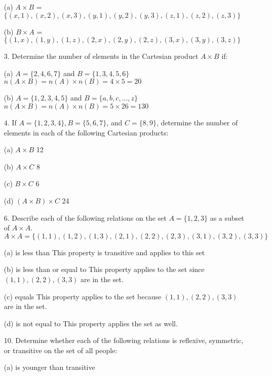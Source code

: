 \documentclass{article}
\begin{document}
\begin{itemize}
    (a) $A \times B$ {\color{blue} = $\{(x,1), (x,2), (x,3), (y,1), (y,2), (y,3), (z,1), (z,2), (z,3)\}$}
    
    (b) $B \times A$ {\color{blue} = $\{(1,x), (1,y), (1,z), (2,x), (2,y), (2,z), (3,x), (3,y), (3,z)\}$}
    
    \item[3.] Determine the number of elements in the Cartesian product $A \times B$ if:
    
    (a) $A = \{2, 4, 6, 7\}$ and $B = \{1, 3, 4, 5, 6\}$ {\color{blue} $n(A \times B) = n(A) \times n(B) = 4\times5 = 20$} 
    
    (b) $A = \{1, 2, 3, 4, 5\}$ and $B = \{a, b, c, ..., z\}$ {\color{blue} $n(A \times B) = n(A) \times n(B) = 5 \times 26 = 130$} 
    
    \item[4.] If $A = \{1, 2, 3, 4\}, B = \{5, 6, 7\}$, and $C = \{8, 9\}$, determine the number of elements in each of the following Cartesian products:
    
    (a) $A \times B$ {\color{blue} 12}
    
    (b) $A \times C$ {\color{blue} 8}
    
    (c) $B \times C$ {\color{blue} 6}
    
    (d) $(A \times B) \times C$ {\color{blue} 24}
    
    \item[6.] Describe each of the following relations on the set $A = \{1, 2, 3\}$ as a subset of $A \times A$.\\
    {\color{blue} $A \times A = \{ (1,1),(1,2),(1,3),(2,1),(2,2),(2,3),(3,1),(3,2),(3,3)\}$}
    
    (a) is less than {\color{blue} This property is transitive and applies to this set}
    
    (b) is less than or equal to {\color{blue} This property applies to the set since $(1,1), (2,2), (3,3)$ are in the set.}
    
    (c) equals {\color{blue} This property applies to the set because $(1,1), (2,2), (3,3)$ are in the set.}
    
    (d) is not equal to {\color{blue} This property applies the set as well.}
    
    \item[10.] Determine whether each of the following relations is reflexive, symmetric, or transitive on the set of all people:
    
    (a) is younger than
    {\color{blue} transitive}
    

\end{itemize}
\end{document}
